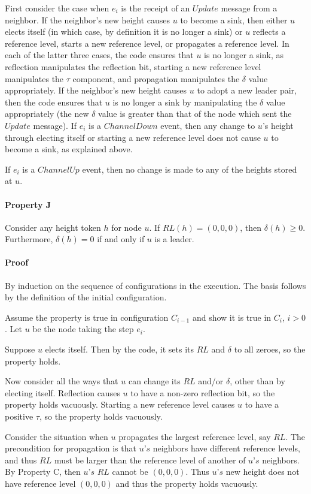 First consider the case when $e_i$ is the receipt of an $Update$ message from a neighbor. If the neighbor’s new height causes $u$ to become a sink, then either $u$ elects itself (in which case, by definition it is no longer a sink) or $u$ reflects a reference level, starts a new reference level, or propagates a reference level. In each of the latter three cases, the code ensures that $u$ is no longer a sink, as reflection manipulates the reflection bit, starting a new reference level manipulates the $\tau$ component, and propagation manipulates the $\delta$ value appropriately. If the neighbor’s new height causes $u$ to adopt a new leader pair, then the code ensures that $u$ is no longer a sink by manipulating the $\delta$ value appropriately (the new $\delta$ value is greater than that of the node which sent the $Update$ message). If $e_i$ is a $ChannelDown$ event, then any change to $u$’s height through electing itself or starting a new reference level does not cause $u$ to become a sink, as explained above.

If $e_i$ is a $ChannelUp$ event, then no change is made to any of the heights stored at $u$.

\paragraph{Property J}Consider any height token $h$ for node $u$. If $RL(h) = (0, 0, 0)$, then $\delta (h) \geq 0$. Furthermore, $\delta (h) = 0$ if and only if $u$ is a leader.

\paragraph{Proof}By induction on the sequence of configurations in the execution. The basis follows by the definition of the initial configuration.

Assume the property is true in configuration $C_{i-1}$ and show it is true in $C_i$, $i > 0$. Let $u$ be the node taking the step $e_i$.

Suppose $u$ elects itself. Then by the code, it sets its $RL$ and $\delta$ to all zeroes, so the property holds.

Now consider all the ways that $u$ can change its $RL$ and/or $\delta$, other than by electing itself. Reflection causes $u$ to have a non-zero reflection bit, so the property holds vacuously. Starting a new reference level causes $u$ to have a positive $\tau$, so the property holds vacuously.

Consider the situation when $u$ propagates the largest reference level, say $RL$. The precondition for propagation is that $u’s$ neighbors have different reference levels, and thus $RL$ must be larger than the reference level of another of $u’s$ neighbors. By Property C, then $u’s$ $RL$ cannot be $(0,0,0)$. Thus $u’s$ new height does not have reference level $(0,0,0)$ and thus the property holds vacuously.


